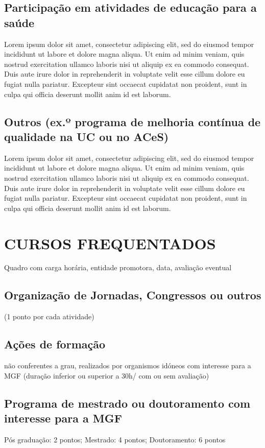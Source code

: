 \documentclass{report}
\begin{document}
\subsection{Participação em atividades de educação para a saúde}
Lorem ipsum dolor sit amet, consectetur adipiscing elit, sed do eiusmod tempor incididunt ut labore et dolore magna aliqua. Ut enim ad minim veniam, quis nostrud exercitation ullamco laboris nisi ut aliquip ex ea commodo consequat. Duis aute irure dolor in reprehenderit in voluptate velit esse cillum dolore eu fugiat nulla pariatur. Excepteur sint occaecat cupidatat non proident, sunt in culpa qui officia deserunt mollit anim id est laborum.
\subsection{Outros (ex.º programa de melhoria contínua de qualidade na UC ou no ACeS)}
Lorem ipsum dolor sit amet, consectetur adipiscing elit, sed do eiusmod tempor incididunt ut labore et dolore magna aliqua. Ut enim ad minim veniam, quis nostrud exercitation ullamco laboris nisi ut aliquip ex ea commodo consequat. Duis aute irure dolor in reprehenderit in voluptate velit esse cillum dolore eu fugiat nulla pariatur. Excepteur sint occaecat cupidatat non proident, sunt in culpa qui officia deserunt mollit anim id est laborum.

\section{CURSOS FREQUENTADOS}
Quadro com carga horária, entidade promotora, data, avaliação eventual
\subsection{Organização de Jornadas, Congressos ou outros}
(1 ponto por cada atividade)

\subsection{Ações de formação}
não conferentes a grau, realizados por organismos idóneos com interesse para a MGF (duração inferior ou superior a 30h/ com ou sem avaliação)

\subsection{Programa de mestrado ou doutoramento com interesse para a MGF}
Pós graduação: 2 pontos; Mestrado: 4 pontos; Doutoramento: 6 pontos
\end{document}
